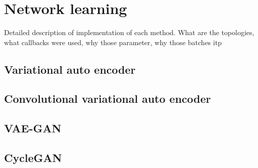 \chapter{Network learning}
Detailed description of implementation of each method. What are the topologies, what callbacks were used, why those parameter, why those batches itp
\section{Variational auto encoder}
\section{Convolutional variational auto encoder}
\section{VAE-GAN}
\section{CycleGAN}